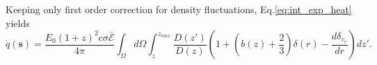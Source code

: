 \documentclass[twocolumns]{emulateapj}
\begin{document}










Keeping only first order correction for density fluctuations, Eq.\ref{eq:int_exp_heat} yields
\begin{equation}
  \label{eq:mean_heat0}
  \dot{q}(\mathbf{s})=\frac{E_0(1+z)^2c\sigma\mathcal{\bar{E}}}{4\pi}\int_{\Omega}d\Omega\int_z^{z_{max}}\frac{D(z')}{D(z)}\left(1+\left(b(z)+\frac{2}{3}\right) \delta(r) -\frac{d\delta_{v_r}}{dr}\right) dz'.
\end{equation}
\end{document}
